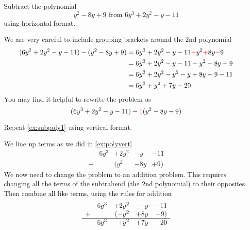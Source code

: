 \begin{myexample}\label{ex:subpoly1}
Subtract the polynomial
\[
	y^2-8y+9 \text{ from } 6y^3+2y^2-y-11 
\]
using horizontal format.
\end{myexample}
\begin{myProof}
	We are very careful to include grouping brackets around the 2nd polynomial
	\begin{align*}
		(6y^3+2y^2-y-11) - (y^2-8y+9) & =		6y^3+2y^2-y-11 {\color{red}-}y^2 {\color{red}+} 8y {\color{red}-} 9 \\
		                              & =		6y^3+2y^2-y-11-y^2+8y-9                                             \\
		                              & =		6y^3+2y^2-y^2-y+8y-9-11                                             \\
		                              & =		6y^3+y^2+7y-20                                                      
	\end{align*}
	You may find it helpful to rewrite the problem as
	\[
		(6y^3+2y^2-y-11) - {\color{red}1}(y^2-8y+9)
	\]
\end{myProof}

\begin{myexample}\label{ex:subpoly2}
Repeat \cref{ex:subpoly1} using vertical format.
\end{myexample}
\begin{myProof}
	We line up terms as we did in \cref{ex:polyvert}
	\begin{equation*}
		\begin{array}{crrrr}
			  & 6y^3 & +2y^2 & -y  & -11 \\
			- &      & (y^2  & -8y & +9) 
		\end{array}
	\end{equation*}
	We now need to change the problem to an addition problem. This requires
	changing all the terms of the subtrahend (the 2nd polynomial) to their opposites. Then combine
	all like terms, using the rules for addition
	\begin{equation*}
		\begin{array}{crrrr}
			  & 6y^3 & +2y^2 & -y  & -11 \\
			+ &      & (-y^2 & +8y & -9) \\ \hline
			  & 6y^3 & +y^2  & +7y & -20 
		\end{array}
	\end{equation*}
\end{myProof}

